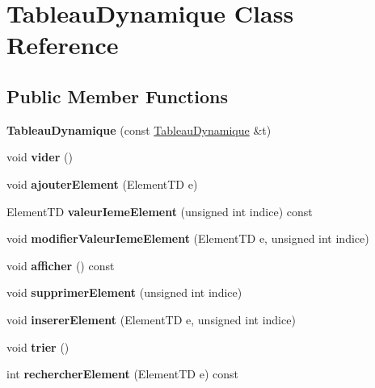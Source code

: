 \hypertarget{classTableauDynamique}{}\section{Tableau\+Dynamique Class Reference}
\label{classTableauDynamique}
\subsection*{Public Member Functions}
\begin{DoxyCompactItemize}
\item 
\mbox{\label{classTableauDynamique_a3eb7e3d118ca6360f6356343d5a354e0}} 
{\bfseries Tableau\+Dynamique} (const \mbox{\hyperlink{classTableauDynamique}{Tableau\+Dynamique}} \&t)
\item 
\mbox{\label{classTableauDynamique_a9eb09425f64ac6767fb24040c6ad612c}} 
void {\bfseries vider} ()
\item 
\mbox{\label{classTableauDynamique_af0e3d25237cf2959ad90727495fa41a0}} 
void {\bfseries ajouter\+Element} (Element\+TD e)
\item 
\mbox{\label{classTableauDynamique_aabfe3df277004518334d1aea2a9b82cc}} 
Element\+TD {\bfseries valeur\+Ieme\+Element} (unsigned int indice) const
\item 
\mbox{\label{classTableauDynamique_a664ad3d6d76699f91f9fc952751c801f}} 
void {\bfseries modifier\+Valeur\+Ieme\+Element} (Element\+TD e, unsigned int indice)
\item 
\mbox{\label{classTableauDynamique_a53e016c1db28b9f554f14560f99bd7c7}} 
void {\bfseries afficher} () const
\item 
\mbox{\label{classTableauDynamique_a8d012c0963adcf88a9415ad68e31c9d0}} 
void {\bfseries supprimer\+Element} (unsigned int indice)
\item 
\mbox{\label{classTableauDynamique_a0aa8c67bde21e2f67ab7f9fbba9211b5}} 
void {\bfseries inserer\+Element} (Element\+TD e, unsigned int indice)
\item 
\mbox{\label{classTableauDynamique_a204e42d1b4dd193d4fde4cfbe1c0a7da}} 
void {\bfseries trier} ()
\item 
\mbox{\label{classTableauDynamique_acaad7f5d10bb4ad9ee71d4e66e09fb4d}} 
int {\bfseries rechercher\+Element} (Element\+TD e) const
\end{DoxyCompactItemize}
